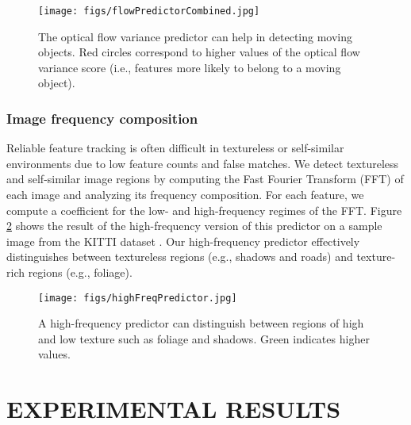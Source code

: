 \documentclass[letterpaper, 10 pt, conference]{ieeeconf}  %
\begin{document}
\begin{figure}
    \centering
    \texttt{[image: figs/flowPredictorCombined.jpg]}
    \caption{The optical flow variance predictor can help in detecting moving objects. Red circles correspond to higher values of the optical flow variance score (i.e., features more likely to belong to a moving object).}
    \label{fig:flow_variance}
\end{figure}

\subsubsection{Image frequency composition}
Reliable feature tracking is often difficult in textureless or self-similar environments due to low feature counts and false matches.
We detect textureless and self-similar image regions by computing the Fast Fourier Transform (FFT) of each image and analyzing its frequency composition.
For each feature, we compute a coefficient for the low- and high-frequency regimes of the FFT.
Figure \ref{fig:high_frequency} shows the result of the high-frequency version of this predictor on a sample image from the KITTI dataset \cite{Geiger:2013kp}.
Our high-frequency predictor effectively distinguishes between textureless regions (e.g., shadows and roads) and texture-rich regions (e.g., foliage).

\begin{figure}
    \centering
    \texttt{[image: figs/highFreqPredictor.jpg]}
    \caption{A high-frequency predictor can distinguish between regions of high and low texture such as foliage and shadows. Green indicates higher values.}
    \label{fig:high_frequency}
\end{figure}


\section{EXPERIMENTAL RESULTS} \label{sec:results}
\end{document}
